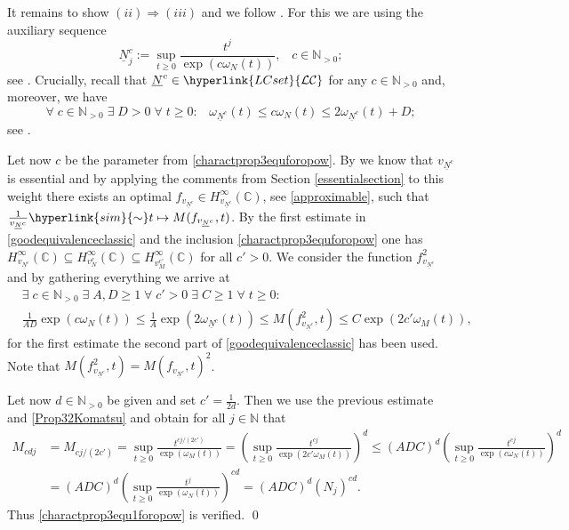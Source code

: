 \documentclass[10pt]{amsart}%
\numberwithin{equation}{section}
\theoremstyle{plain}
\newcommand{\CC}{\mathbb{C}}
\newcommand{\NN}{\mathbb{N}}
\begin{document}
It remains to show $(ii)\Rightarrow(iii)$ and we follow \cite[Prop. 3.18 $(i)$]{weightedentirecharacterization}. For this we are using the auxiliary sequence
\begin{equation}\label{auxilarysequ}
	\underline{N}^c_j:=\sup_{t\ge 0}\frac{t^j}{\exp(c\omega_N(t))},\;\;\;c\in\NN_{>0};
\end{equation}
see \cite[$(3.28)$]{weightedentirecharacterization}. Crucially, recall that $\underline{N}^c\in\hyperlink{LCset}{\mathcal{LC}}$ for any $c\in\NN_{>0}$ and, moreover, we have
\begin{equation}\label{goodequivalenceclassic}
	\forall\;c\in\NN_{>0}\;\exists\;D>0\;\forall\;t\ge 0:\;\;\;\omega_{\underline{N}^c}(t)\le c\omega_N(t)\le 2\omega_{\underline{N}^c}(t)+D;
\end{equation}
see \cite[$(3.29)$]{weightedentirecharacterization}.

Let now $c$ be the parameter from \eqref{charactprop3equforopow}. By \cite[Thm. 3.4 $(i)$]{weightedentirecharacterization} we know that $v_{\underline{N}^c}$ is essential and by applying the comments from Section \ref{essentialsection} to this weight there exists an optimal $f_{v_{\underline{N}^c}}\in H^{\infty}_{v_{\underline{N}^c}}(\CC)$, see \eqref{approximable}, such that $\frac{1}{v_{\underline{N}^c}}\hyperlink{sim}{\sim} t\mapsto M(f_{v_{\underline{N}^c}},t)$. By the first estimate in \eqref{goodequivalenceclassic} and the inclusion \eqref{charactprop3equforopow} one has $H^{\infty}_{v_{\underline{N}^c}}(\CC)\subseteq H^{\infty}_{v^c_N}(\CC)\subseteq H^{\infty}_{v^{c'}_M}(\CC)$ for all $c'>0$. We consider the function $f^2_{v_{\underline{N}^c}}$ and by gathering everything we arrive at
\begin{align*}
	&\exists\;c\in\NN_{>0}\;\exists\;A,D\ge 1\;\forall\;c'>0\;\exists\;C\ge 1\;\forall\;t\ge 0:
	\\&
	\frac{1}{AD}\exp(c\omega_N(t))\le\frac{1}{A}\exp(2\omega_{\underline{N}^c}(t))\le M(f^2_{v_{\underline{N}^c}},t)\le C\exp(2c'\omega_M(t)),
\end{align*}
for the first estimate the second part of \eqref{goodequivalenceclassic} has been used. Note that $M(f^2_{v_{\underline{N}^c}},t)=M(f_{v_{\underline{N}^c}},t)^2$.

Let now $d\in\NN_{>0}$ be given and set $c'=\frac{1}{2d}$. Then we use the previous estimate and \eqref{Prop32Komatsu} and obtain for all $j\in\NN$ that
\begin{align*}
	M_{cdj}&=M_{cj/(2c')}=\sup_{t\ge 0}\frac{t^{cj/(2c')}}{\exp(\omega_{M}(t))}=\left(\sup_{t\ge 0}\frac{t^{cj}}{\exp(2c'\omega_{M}(t))}\right)^{d}\le (ADC)^d\left(\sup_{t\ge 0}\frac{t^{cj}}{\exp(c\omega_{N}(t))}\right)^{d}
	\\&
	=(ADC)^d\left(\sup_{t\ge 0}\frac{t^j}{\exp(\omega_{N}(t))}\right)^{cd}=(ADC)^d(N_j)^{cd}.
\end{align*}
Thus \eqref{charactprop3equ1foropow} is verified.
\qed\enddemo
\end{document}
